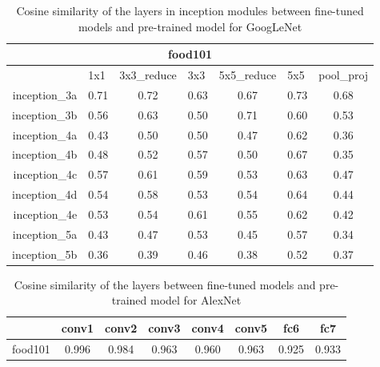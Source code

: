 \begin{table}[htbp]
  \centering
  \caption{Cosine similarity of the layers in inception modules between fine-tuned models and pre-trained model for GoogLeNet}
    \begin{tabular}{r|cccccc}
    \toprule
    \multicolumn{7}{c}{food101} \\ \midrule
          & \multicolumn{1}{l}{1x1 } & \multicolumn{1}{l}{3x3\_reduce} & \multicolumn{1}{l}{3x3} & \multicolumn{1}{l}{5x5\_reduce} & \multicolumn{1}{l}{5x5} & \multicolumn{1}{l}{pool\_proj } \\
    inception\_3a & 0.71  & 0.72  & 0.63  & 0.67  & 0.73  & 0.68 \\
    inception\_3b & 0.56  & 0.63  & 0.50  & 0.71  & 0.60  & 0.53 \\
    inception\_4a & 0.43  & 0.50  & 0.50  & 0.47  & 0.62  & 0.36 \\
    inception\_4b & 0.48  & 0.52  & 0.57  & 0.50  & 0.67  & 0.35 \\
    inception\_4c & 0.57  & 0.61  & 0.59  & 0.53  & 0.63  & 0.47 \\
    inception\_4d & 0.54  & 0.58  & 0.53  & 0.54  & 0.64  & 0.44 \\
    inception\_4e & 0.53  & 0.54  & 0.61  & 0.55  & 0.62  & 0.42 \\
    inception\_5a & 0.43  & 0.47  & 0.53  & 0.45  & 0.57  & 0.34 \\
    inception\_5b & 0.36  & 0.39  & 0.46  & 0.38  & 0.52  & 0.37 \\
    \bottomrule
    \end{tabular}%
  \label{tab:cosg}%
\end{table}%


\begin{table}[htbp]
  \centering
  \caption{Cosine similarity of the layers between fine-tuned models and pre-trained model for AlexNet}
    \begin{tabular}{r|ccccccc}
    \toprule
          & conv1 & conv2 & conv3 & conv4 & conv5 & fc6   & fc7 \\
    \midrule
    food101 & 0.996 & 0.984 & 0.963 & 0.960 & 0.963 & 0.925 & 0.933 \\
    \bottomrule
    \end{tabular}%
  \label{tab:cosa}%
\end{table}%


